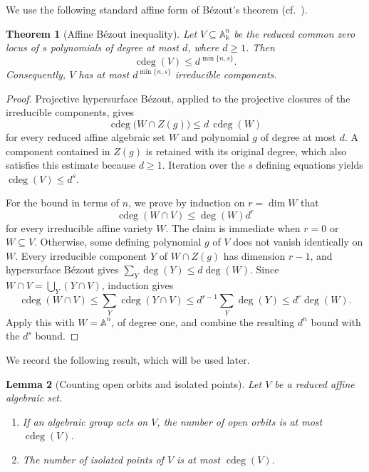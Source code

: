 \documentclass[11pt]{amsart}
\newtheorem{theorem}{Theorem}[section]
\newtheorem{lemma}[theorem]{Lemma}
\theoremstyle{definition}
\theoremstyle{remark}
\newcommand{\kk}{\Bbbk}
\DeclareMathOperator{\cdeg}{cdeg}
\begin{document}
We use the following standard affine form of B\'ezout's theorem
(cf.~\cite{Heintz}).

\begin{theorem}[Affine B\'ezout inequality]\label{thm:affine-bezout}
Let $V\subseteq\mathbb A^n_{\kk}$ be the reduced common zero locus of $s$
polynomials of degree at most $d$, where $d\geq1$.  Then
\begin{equation}\label{eq:affine-bezout}
 \cdeg(V)\leq d^{\min\{n,s\}}.
\end{equation}
Consequently, $V$ has at most $d^{\min\{n,s\}}$ irreducible components.
\end{theorem}

\begin{proof}
Projective hypersurface B\'ezout, applied to the projective closures of
the irreducible components, gives
\begin{equation}\label{eq:bezout-step}
 \cdeg\bigl(W\cap Z(g)\bigr)\leq d\,\cdeg(W)
\end{equation}
for every reduced affine algebraic set $W$ and polynomial $g$ of degree
at most $d$.  A component contained in $Z(g)$ is retained with its
original degree, which also satisfies this estimate because $d\geq1$.
Iteration over the $s$ defining equations yields $\cdeg(V)\leq d^s$.

For the bound in terms of $n$, we prove by induction on $r=\dim W$ that
\[
 \cdeg(W\cap V)\leq\deg(W)d^r
\]
for every irreducible affine variety $W$.  The claim is immediate when
$r=0$ or $W\subseteq V$.  Otherwise, some defining polynomial $g$ of $V$
does not vanish identically on $W$.  Every irreducible component $Y$ of
$W\cap Z(g)$ has dimension $r-1$, and hypersurface B\'ezout gives
$\sum_Y\deg(Y)\leq d\deg(W)$.  Since
$W\cap V=\bigcup_Y(Y\cap V)$, induction gives
\[
 \cdeg(W\cap V)
 \leq\sum_Y\cdeg(Y\cap V)
 \leq d^{r-1}\sum_Y\deg(Y)
 \leq d^r\deg(W).
\]
Apply this with $W=\mathbb A^n$, of degree one, and combine the resulting
$d^n$ bound with the $d^s$ bound.
\end{proof}

We record the following result, which will be used later.

\begin{lemma}[Counting open orbits and isolated points]\label{lem:degree-counting}
Let $V$ be a reduced affine algebraic set.
\begin{enumerate}[label=\textup{(\roman*)}]
 \item If an algebraic group acts on $V$, the number of open orbits is at
 most $\cdeg(V)$.
 \item The number of isolated points of $V$ is at most $\cdeg(V)$.
\end{enumerate}
\end{lemma}
\end{document}

